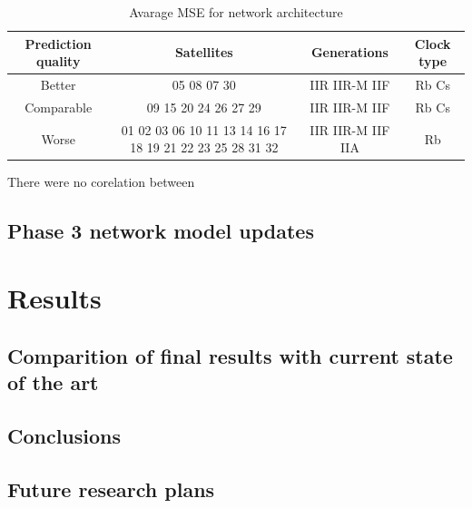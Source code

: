 \begin{table}[ht] 
	\centering
	\caption{Avarage MSE for network architecture}
	\label{tab:phase_2_groups}
	\begin{tabular}{cccc}
		\hline
		\hline
		Prediction quality& Satellites& Generations& Clock type  \\
		\hline
		Better& 05 08 07 30& IIR IIR-M IIF& Rb Cs\\
		Comparable& 09 15 20 24 26 27 29& IIR IIR-M IIF& Rb Cs\\
		Worse& 01 02 03 06 10 11 13 14 16 17 18 19 21 22 23 25 28 31 32& IIR IIR-M IIF IIA& Rb
		\hline
		\hline
	\end{tabular}
There were no corelation between 
\end{table}
\subsection{Phase 3 network model updates}


\section{Results}

\subsection{Comparition of final results with current state of the art}

\subsection{Conclusions}

\subsection{Future research plans}






